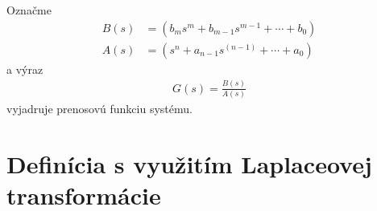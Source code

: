 \documentclass[a4paper, 10pt, ]{article}
\begin{document}
Označme
\begin{subequations}
	\begin{align}
		B(s) &= \left( b_m   s^m + b_{m-1}   s^{m-1} + \cdots + b_0 \right) \\
		A(s) &=  \left( s^n + a_{n-1}   s^{(n-1)} + \cdots + a_0 \right)
	\end{align}
\end{subequations}
a výraz
\begin{align}
	G(s) = \frac{B(s)}{A(s)}
\end{align}
vyjadruje prenosovú funkciu systému.



\section{Definícia s využitím Laplaceovej transformácie}



















\printbibliography[title={Referencie a ďalšia literatúra}]
\end{document}
